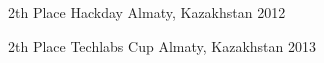 



\begin{cvhonors}

  \cvhonor
    {2th Place} %
    {Hackday} %
    {Almaty, Kazakhstan} %
    {2012} %

  \cvhonor
    {2th Place} %
    {Techlabs Cup} %
    {Almaty, Kazakhstan} %
    {2013} %

\end{cvhonors}

